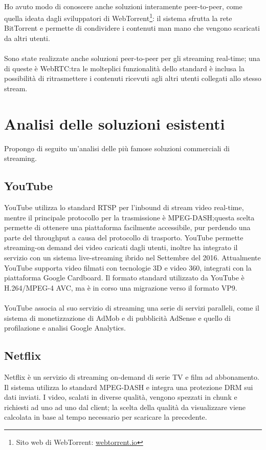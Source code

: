 	\paragraph*{}
	Ho avuto modo di conoscere anche soluzioni interamente peer-to-peer, come quella ideata dagli sviluppatori di WebTorrent\footnote{Sito web di WebTorrent: \href{https://webtorrent.io/}{webtorrent.io}}: il sistema sfrutta la rete BitTorrent e permette di condividere i contenuti man mano che vengono scaricati da altri utenti.
	\paragraph*{}
	Sono state realizzate anche soluzioni peer-to-peer per gli streaming real-time; una di queste è WebRTC:\@ tra le molteplici funzionalità dello standard è inclusa la possibilità di ritrasmettere i contenuti ricevuti agli altri utenti collegati allo stesso stream.

	\section{Analisi delle soluzioni esistenti}
	Propongo di seguito un'analisi delle più famose soluzioni commerciali di streaming.
		\subsection{YouTube}
		YouTube utilizza lo standard \gls{RTSP} per l'inbound di stream video real-time, mentre il principale protocollo per la trasmissione è MPEG-DASH;\@ questa scelta permette di ottenere una piattaforma facilmente accessibile, pur perdendo una parte del throughput a causa del protocollo di trasporto. YouTube permette streaming-on demand dei video caricati dagli utenti, inoltre ha integrato il servizio con un sistema live-streaming ibrido nel Settembre del 2016. Attualmente YouTube supporta video filmati con tecnologie 3D e video 360\textdegree, integrati con la piattaforma Google Cardboard. Il formato standard utilizzato da YouTube è H.264/MPEG-4 AVC, ma è in corso una migrazione verso il formato VP9.
		\paragraph*{}
		YouTube associa al suo servizio di streaming una serie di servizi paralleli, come il sistema di monetizzazione di AdMob e di pubblicità AdSense e quello di profilazione e analisi Google Analytics.
	
		\subsection{Netflix}
		Netflix è un servizio di streaming on-demand di serie TV e film ad abbonamento. Il sistema utilizza lo standard \gls{MPEG-DASH} e integra una protezione \gls{DRM} sui dati inviati. I video, scalati in diverse qualità, vengono spezzati in chunk e richiesti ad uno ad uno dal client; la scelta della qualità da visualizzare viene calcolata in base al tempo necessario per scaricare la precedente.
